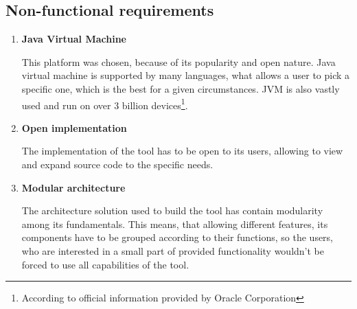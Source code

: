\subsection{Non-functional requirements}
\begin{enumerate}
\item \textbf{Java Virtual Machine}

This platform was chosen, because of its popularity and open nature. Java virtual machine is supported by many languages, what allows a user to pick a specific one, which is the best for a given circumstances. JVM is also vastly used and run on over 3 billion devices\footnote{According to official information provided by Oracle Corporation}.
\medbreak

\item \textbf{Open implementation}

The implementation of the tool has to be open to its users, allowing to view and expand source code to the specific needs. 
\medbreak

\item \textbf{Modular architecture}

The architecture solution used to build the tool has contain modularity among its fundamentals. This means, that allowing different features, its components have to be grouped according to their functions, so the users, who are interested in a small part of provided functionality wouldn't be forced to use all capabilities of the tool.

\end{enumerate}

